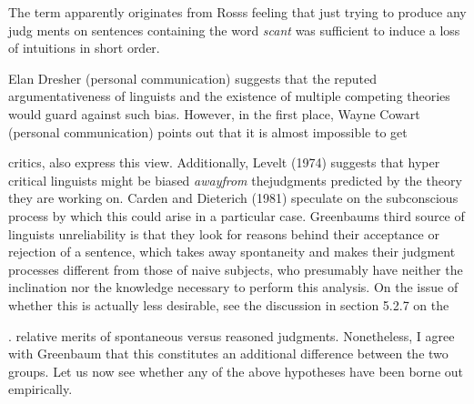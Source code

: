 \setcounter{listWWNumxxxixleveli}{17}
\begin{listWWNumxxxixleveli}
\item 
\begin{styleStandard}
The term apparently originates from Ross{\textquotesingle}s feeling that just trying to produce any judg\- ments on sentences containing the word \textit{scant}\textit{ }was sufficient to induce a loss of intuitions in short order.
\end{styleStandard}


\item 
\begin{styleStandard}
Elan Dresher (personal communication) suggests that the reputed argumentativeness of linguists and the existence of multiple competing theories would guard against such bias. However, in the first place, Wayne Cowart (personal communication) points out that it is almost impossible to get
\end{styleStandard}


\end{listWWNumxxxixleveli}
\clearpage\setcounter{page}{1}\begin{styleTextbody}
critics, also express this view. Additionally, Levelt (1974) suggests that hyper\- critical linguists might be biased \textit{away}\textit{from}\textit{ }thejudgments predicted by the theory they are working on. Carden and Dieterich (1981) speculate on the subconscious process by which this could arise in a particular case. Greenbaum{\textquotesingle}s third source of linguists{\textquotesingle} unreliability is that they look for reasons behind their acceptance or rejection of a sentence, which takes away spontaneity and makes their judgment processes different from those of naive subjects, who presumably have neither the inclination nor the knowledge necessary to perform this analysis. On the issue of whether this is actually less desirable, see the discussion in section 5.2.7 on the
\end{styleTextbody}


\begin{styleTextbody}
. relative merits of spontaneous versus reasoned judgments. Nonetheless, I agree with Greenbaum that this constitutes an additional difference between the two groups. Let us now see whether any of the above hypotheses have been borne out empirically.
\end{styleTextbody}


